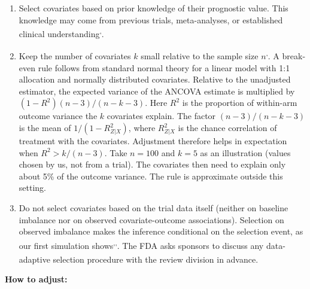 \documentclass[
  11pt,
]{article}
\providecommand{\tightlist}{%
  \setlength{\itemsep}{0pt}\setlength{\parskip}{0pt}}
\begin{document}
\begin{enumerate}
\def\labelenumi{\arabic{enumi}.}
\setcounter{enumi}{3}
\tightlist
\item
  Select covariates based on prior knowledge of their
  prognostic value. This knowledge may come from previous
  trials, meta-analyses, or established clinical
  understanding\textsuperscript{,}.
\item
  Keep the number of covariates \(k\) small relative to
  the sample size \(n\)\textsuperscript{,}. A break-even rule
  follows from standard normal theory for a linear
  model with 1:1 allocation and normally distributed
  covariates. Relative to the unadjusted estimator,
  the expected variance of the ANCOVA estimate is
  multiplied by \((1 - R^2)(n - 3)/(n - k - 3)\). Here
  \(R^2\) is the proportion of within-arm outcome
  variance the \(k\) covariates explain. The factor
  \((n - 3)/(n - k - 3)\) is the mean of
  \(1/(1 - R^2_{Z|X})\), where \(R^2_{Z|X}\) is the chance
  correlation of treatment with the covariates.
  Adjustment therefore helps in expectation when
  \(R^2 > k/(n - 3)\). Take \(n = 100\) and \(k = 5\) as an
  illustration (values chosen by us, not from a
  trial). The covariates then need to explain only
  about 5\% of the outcome variance. The rule is approximate outside
  this setting.
\item
  Do not select covariates based on the trial data
  itself (neither on baseline imbalance nor on
  observed covariate-outcome associations).
  Selection on observed imbalance makes the inference
  conditional on the selection event, as our first
  simulation shows\textsuperscript{,,}.
  The FDA asks sponsors to discuss any data-adaptive
  selection procedure with the review division in
  advance\textsuperscript{}.
\end{enumerate}

\textbf{How to adjust:}
\end{document}

